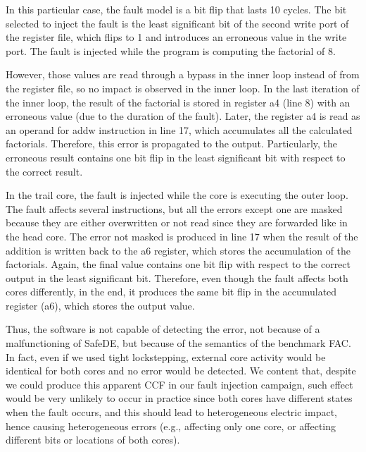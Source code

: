 In this particular case, the fault model is a bit flip that lasts 10 cycles. The bit selected to inject the fault is the least significant bit of the second write port of the register file, which flips to 1 and introduces an erroneous value in the write port. The fault is injected while the program is computing the factorial of 8. 

However, those values are read through a bypass in the inner loop instead of from the register file, so no impact is observed in the inner loop. In the last iteration of the inner loop, the result of the factorial is stored in register a4 (line 8) with an erroneous value (due to the duration of the fault). Later, the register a4 is read as an operand for addw instruction in line 17, which accumulates all the calculated factorials. Therefore, this error is propagated to the output. Particularly, the erroneous result contains one bit flip in the least significant bit with respect to the correct result.

In the trail core, the fault is injected while the core is executing the outer loop. The fault affects several instructions, but all the errors except one are masked because they are either overwritten or not read since they are forwarded like in the head core. The error not masked is produced in line 17 when the result of the addition is written back to the a6 register, which stores the accumulation of the factorials. Again, the final value contains one bit flip with respect to the correct output in the least significant bit. Therefore, even though the fault affects both cores differently, in the end, it produces the same bit flip in the accumulated register (a6), which stores the output value.

Thus, the software is not capable of detecting the error, not because of a malfunctioning of SafeDE, but because of the semantics of the benchmark FAC. In fact, even if we used tight lockstepping, external core activity would be identical for both cores and no error would be detected. We content that, despite we could produce this apparent CCF in our fault injection campaign, such effect would be very unlikely to occur in practice since both cores have different states when the fault occurs, and this should lead to heterogeneous electric impact, hence causing heterogeneous errors (e.g., affecting only one core, or affecting different bits or locations of both cores).

